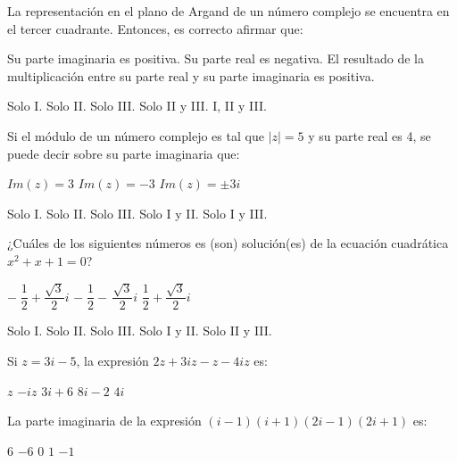 \documentclass[]{srs}
\begin{document}
\begin{preguntas}[after-item-skip=2cm]
\pregunta La representación en el plano de Argand de un número complejo se encuentra
en el tercer cuadrante. Entonces, es correcto afirmar que:\\
\begin{vertical*}
  \alternativa Su parte imaginaria es positiva.
  \alternativa Su parte real es negativa.
  \alternativa El resultado de la multiplicación entre su parte real y
  su parte imaginaria es positiva.
\end{vertical*}
\begin{vertical}
  \alternativa Solo I.
  \alternativa Solo II.
  \alternativa Solo III.
  \alternativa Solo II y III.
  \alternativa I, II y III.
\end{vertical}


\pregunta Si el módulo de un número complejo es tal que $|z|=5$ y su parte real es 4,
se puede decir sobre su parte imaginaria que:\\
\begin{vertical*}
  \alternativa $Im(z)=3$
  \alternativa $Im(z)=-3$
  \alternativa $Im(z)=\pm 3i$
\end{vertical*}
\begin{vertical}
  \alternativa Solo I.
  \alternativa Solo II.
  \alternativa Solo III.
  \alternativa Solo I y II.
  \alternativa Solo I y III.
\end{vertical}

\pregunta ¿Cuáles de los siguientes números es (son) solución(es) de la ecuación
cuadrática $x^2+x+1=0$?\\
\begin{vertical*}
  \alternativa $-\;\dfrac{1}{2}+\dfrac{\sqrt{3}}{2}i$
  \alternativa $-\;\dfrac{1}{2}-\,\dfrac{\sqrt{3}}{2}i$
  \alternativa $\dfrac{1}{2}+\dfrac{\sqrt{3}}{2}i$
\end{vertical*}
\begin{vertical}
  \alternativa Solo I.
  \alternativa Solo II.
  \alternativa Solo III.
  \alternativa Solo I y II.
  \alternativa Solo II y III.
\end{vertical}

\pregunta Si $z=3i-5$, la expresión $2z+3iz-z-4iz$ es:\\
\begin{vertical}
  \alternativa $z$
  \alternativa $-iz$
  \alternativa $3i+6$
  \alternativa $8i-2$
  \alternativa $4i$
\end{vertical}



\pregunta La parte imaginaria de la expresión
$(i-1)(i+1)(2i-1)(2i+1)$ es:\\
\begin{vertical}
\alternativa $6$
\alternativa $-6$
\alternativa $0$
\alternativa $1$
\alternativa $-1$
\end{vertical}



\end{preguntas}
\end{document}
